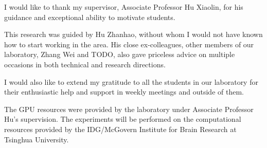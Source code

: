 
\begin{acknowledgements}
  I would like to thank my supervisor, Associate Professor Hu Xiaolin, for his guidance and exceptional ability to motivate students.

  This research was guided by Hu Zhanhao, without whom I would not have known how to start working in the area. 
  His close ex-colleagues, other members of our laboratory, Zhang Wei and TODO, also gave priceless advice on multiple occasions in both technical and research directions.

  I would also like to extend my gratitude to all the students in our laboratory for their enthusiastic help and support in weekly meetings and outside of them.

  The GPU resources were provided by the laboratory under Associate Professor Hu's supervision. 
  The experiments will be performed on the computational resources provided by the IDG/McGovern Institute for Brain Research at Tsinghua University.

\end{acknowledgements}
